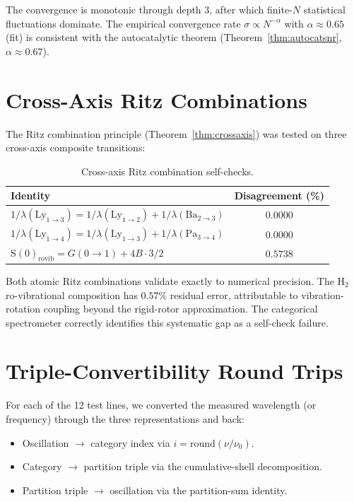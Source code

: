 \documentclass[11pt,a4paper]{article}
\theoremstyle{thmstyle}
\theoremstyle{axiomstyle}
\theoremstyle{definition}
\theoremstyle{remark}
\begin{document}
The convergence is monotonic through depth 3, after which finite-$N$ statistical fluctuations dominate. The empirical convergence rate $\sigma\propto N^{-\alpha}$ with $\alpha\approx 0.65$ (fit) is consistent with the autocatalytic theorem (Theorem~\ref{thm:autocatsnr}, $\alpha\approx 0.67$).

\section{Cross-Axis Ritz Combinations}
\label{sec:ritz_results}

The Ritz combination principle (Theorem~\ref{thm:crossaxis}) was tested on three cross-axis composite transitions:

\begin{table}[H]
\centering
\caption{Cross-axis Ritz combination self-checks.}
\label{tab:ritz}
\begin{tabular}{lc}
\toprule
Identity & Disagreement (\%)\\
\midrule
$1/\lambda(\mathrm{Ly}_{1\to 3})=1/\lambda(\mathrm{Ly}_{1\to 2})+1/\lambda(\mathrm{Ba}_{2\to 3})$ & $0.0000$\\
$1/\lambda(\mathrm{Ly}_{1\to 4})=1/\lambda(\mathrm{Ly}_{1\to 3})+1/\lambda(\mathrm{Pa}_{3\to 4})$ & $0.0000$\\
$\mathrm{S}(0)_{\mathrm{rovib}}=G(0\to 1)+4B\cdot 3/2$ & $0.5738$\\
\bottomrule
\end{tabular}
\end{table}

Both atomic Ritz combinations validate exactly to numerical precision. The H$_{2}$ ro-vibrational composition has $0.57\%$ residual error, attributable to vibration-rotation coupling beyond the rigid-rotor approximation. The categorical spectrometer correctly identifies this systematic gap as a self-check failure.

\section{Triple-Convertibility Round Trips}
\label{sec:triple_results}

For each of the 12 test lines, we converted the measured wavelength (or frequency) through the three representations and back:
\begin{itemize}[nosep]
\item Oscillation $\to$ category index via $i=\mathrm{round}(\nu/\nu_{0})$.
\item Category $\to$ partition triple via the cumulative-shell decomposition.
\item Partition triple $\to$ oscillation via the partition-sum identity.
\end{itemize}
\end{document}
